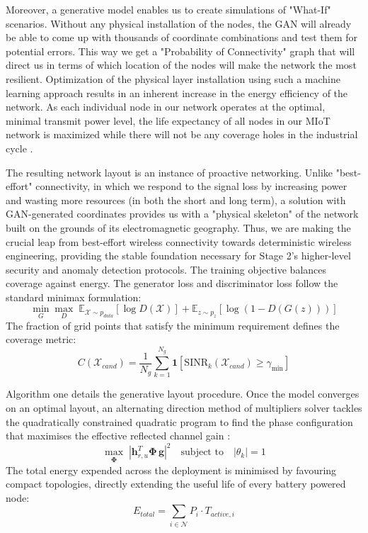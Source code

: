 \documentclass[a4paper,fleqn]{cas-dc}
\numberwithin{equation}{section}
\begin{document}
Moreover, a generative model enables us to create simulations of "What-If" scenarios. Without any physical installation of the nodes, the GAN will already be able to come up with thousands of coordinate combinations and test them for potential errors. This way we get a "Probability of Connectivity" graph that will direct us in terms of which location of the nodes will make the network the most resilient. Optimization of the physical layer installation using such a machine learning approach results in an inherent increase in the energy efficiency of the network. As each individual node in our network operates at the optimal, minimal transmit power level, the life expectancy of all nodes in our MIoT network is maximized while there will not be any coverage holes in the industrial cycle \cite{b2}.

The resulting network layout is an instance of proactive networking. Unlike "best-effort" connectivity, in which we respond to the signal loss by increasing power and wasting more resources (in both the short and long term), a solution with GAN-generated coordinates provides us with a "physical skeleton" of the network built on the grounds of its electromagnetic geography. Thus, we are making the crucial leap from best-effort wireless connectivity towards deterministic wireless engineering, providing the stable foundation necessary for Stage 2’s higher-level security and anomaly detection protocols. The training objective balances coverage against energy. The generator loss and discriminator loss follow the standard minimax formulation:
\begin{equation}
\label{eq:gan_loss}
\min_{G}\max_{D}\; \mathbb{E}_{\mathcal{X}\sim p_{data}}\!\left[\log D(\mathcal{X})\right] + \mathbb{E}_{z\sim p_z}\!\left[\log\!\left(1 - D(G(z))\right)\right]
\end{equation}
The fraction of grid points that satisfy the minimum requirement defines the coverage metric:
\begin{equation}
\label{eq:coverage}
C(\mathcal{X}_{cand}) = \frac{1}{N_g} \sum_{k=1}^{N_g} \mathbf{1}\!\left[\text{SINR}_k\!\left(\mathcal{X}_{cand}\right) \geq \gamma_{\min}\right]
\end{equation}

Algorithm one details the generative layout procedure. Once the model converges on an optimal layout, an alternating direction method of multipliers solver tackles the quadratically constrained quadratic program to find the phase configuration that maximises the effective reflected channel gain \cite{b4}:
\begin{equation}
\label{eq:qcqp}
\max_{\boldsymbol{\Phi}}\;\left|\boldsymbol{h}_{r,u}^{T}\boldsymbol{\Phi}\,\boldsymbol{g}\right|^2 \quad \text{subject to}\quad |\theta_k| = 1
\end{equation}
The total energy expended across the deployment is minimised by favouring compact topologies, directly extending the useful life of every battery powered node:
\begin{equation}
\label{eq:energy}
E_{total} = \sum_{i \in \mathcal{N}} P_i \cdot T_{active,i}
\end{equation}
\end{document}
